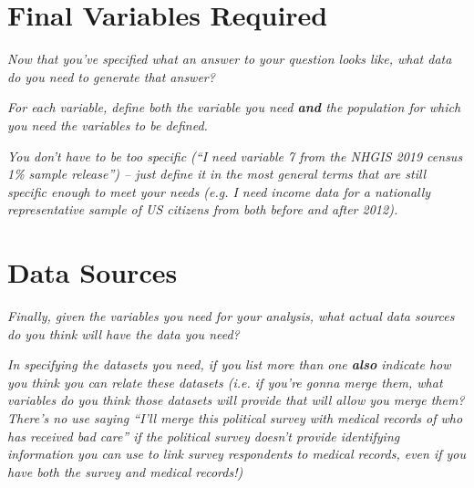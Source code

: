 \documentclass[12pt]{article}
\begin{document}
\section{Final Variables Required}

\emph{Now that you've specified what an answer to your question looks like, what data do you need to generate that answer?}

\emph{For each variable, define both the variable you need \textbf{and} the population for which you need the variables to be defined.}

\emph{You don't have to be too specific (``I need variable 7 from the NHGIS 2019 census 1\% sample release'') -- just define it in the most general terms that are still specific enough to meet your needs (e.g. I need income data for a nationally representative sample of US citizens from both before and after 2012). }

\section{Data Sources}\label{section_datasources}

\emph{Finally, given the variables you need for your analysis, what actual data sources do you think will have the data you need?}

\emph{In specifying the datasets you need, if you list more than one \textbf{also} indicate how you think you can relate these datasets (i.e. if you're gonna merge them, what variables do you think those datasets will provide that will allow you merge them? There's no use saying ``I'll merge this political survey with medical records of who has received bad care'' if the political survey doesn't provide identifying information you can use to link survey respondents to medical records, even if you have both the survey and medical records!)}
\end{document}
